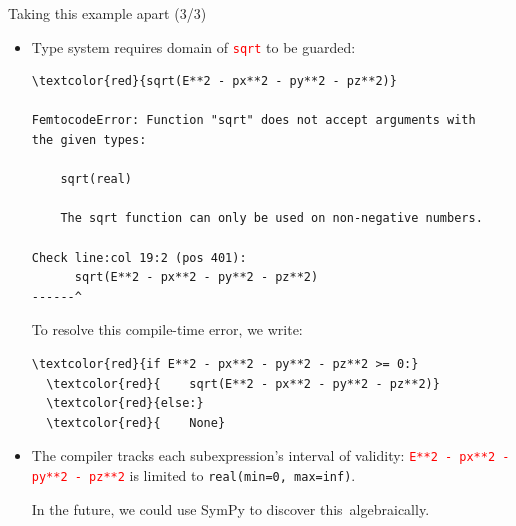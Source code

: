 \documentclass{beamer}
\begin{document}
\begin{frame}[fragile]{Taking this example apart (3/3)}
\vspace{0.2 cm}
\begin{itemize}
\item Type system requires domain of \textcolor{red}{\tt sqrt} to be guarded:

\scriptsize
\begin{Verbatim}[commandchars=\\\{\}]
  \textcolor{red}{sqrt(E**2 - px**2 - py**2 - pz**2)}

FemtocodeError: Function "sqrt" does not accept arguments with
the given types:

    sqrt(real)

    The sqrt function can only be used on non-negative numbers.

Check line:col 19:2 (pos 401):
      sqrt(E**2 - px**2 - py**2 - pz**2)
------^
\end{Verbatim}

\vspace{0.1 cm}
\normalsize To resolve this compile-time error, we write:

\scriptsize
\begin{Verbatim}[commandchars=\\\{\}]
  \textcolor{red}{if E**2 - px**2 - py**2 - pz**2 >= 0:}
  \textcolor{red}{    sqrt(E**2 - px**2 - py**2 - pz**2)}
  \textcolor{red}{else:}
  \textcolor{red}{    None}
\end{Verbatim}

\normalsize

\item The compiler tracks each subexpression's interval of validity: \textcolor{red}{\tt\scriptsize E**2 - px**2 - py**2 - pz**2} is limited to \mbox{{\tt\scriptsize real(min=0, max=inf)}.\hspace{-1 cm}}

\vspace{0.2 cm}
In the future, we could use SymPy to discover \mbox{this algebraically.\hspace{-1 cm}}
\end{itemize}
\end{frame}
\end{document}
